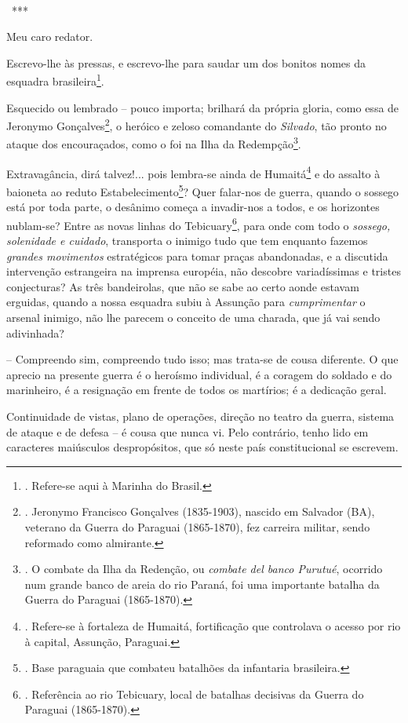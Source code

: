 ~

~***

Meu caro redator.

Escrevo-lhe às pressas, e escrevo-lhe para saudar um dos bonitos nomes
da esquadra brasileira\footnote{. Refere-se aqui à Marinha do Brasil.}.

Esquecido ou lembrado -- pouco importa; brilhará da própria gloria, como
essa de Jeronymo Gonçalves\footnote{. Jeronymo Francisco Gonçalves
  (1835-1903), nascido em Salvador (BA), veterano da Guerra do Paraguai
  (1865-1870), fez carreira militar, sendo reformado como almirante.}, o
heróico e zeloso comandante do \emph{Silvado}, tão pronto no ataque dos
encouraçados, como o foi na Ilha da Redempção\footnote{. O combate da
  Ilha da Redenção, ou \emph{combate del banco Purutué}, ocorrido num
  grande banco de areia do rio Paraná, foi uma importante batalha da
  Guerra do Paraguai (1865-1870).}.

Extravagância, dirá talvez!... pois lembra-se ainda de Humaitá\footnote{.
  Refere-se à fortaleza de Humaitá, fortificação que controlava o acesso
  por rio à capital, Assunção, Paraguai.} e do assalto à baioneta ao
reduto Estabelecimento\footnote{. Base paraguaia que combateu batalhões
  da infantaria brasileira.}? Quer falar-nos de guerra, quando o sossego
está por toda parte, o desânimo começa a invadir-nos a todos, e os
horizontes nublam-se? Entre as novas linhas do Tebicuary\footnote{.
  Referência ao rio Tebicuary, local de batalhas decisivas da Guerra do
  Paraguai (1865-1870).}, para onde com todo o \emph{sossego, solenidade
e cuidado}, transporta o inimigo tudo que tem enquanto fazemos
\emph{grandes movimentos} estratégicos para tomar praças abandonadas, e
a discutida intervenção estrangeira na imprensa européia, não descobre
variadíssimas e tristes conjecturas? As três bandeirolas, que não se
sabe ao certo aonde estavam erguidas, quando a nossa esquadra subiu à
Assunção para \emph{cumprimentar} o arsenal inimigo, não lhe parecem o
conceito de uma charada, que já vai sendo adivinhada?

-- Compreendo sim, compreendo tudo isso; mas trata-se de cousa
diferente. O que aprecio na presente guerra é o heroísmo individual, é a
coragem do soldado e do marinheiro, é a resignação em frente de todos os
martírios; é a dedicação geral.

Continuidade de vistas, plano de operações, direção no teatro da guerra,
sistema de ataque e de defesa -- é cousa que nunca vi. Pelo contrário,
tenho lido em caracteres maiúsculos despropósitos, que só neste país
constitucional se escrevem.

